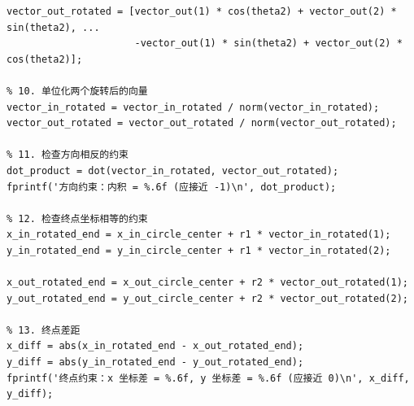 \documentclass{cumcmthesis1}
\begin{document}
\begin{lstlisting}[caption={对问题4中求得的最短调头曲线进行验证的代码}, label={lst:sixth_code}]
% 9. 顺时针旋转后的盘出向量
vector_out_rotated = [vector_out(1) * cos(theta2) + vector_out(2) * sin(theta2), ...
                      -vector_out(1) * sin(theta2) + vector_out(2) * cos(theta2)];

% 10. 单位化两个旋转后的向量
vector_in_rotated = vector_in_rotated / norm(vector_in_rotated);
vector_out_rotated = vector_out_rotated / norm(vector_out_rotated);

% 11. 检查方向相反的约束
dot_product = dot(vector_in_rotated, vector_out_rotated);
fprintf('方向约束：内积 = %.6f (应接近 -1)\n', dot_product);

% 12. 检查终点坐标相等的约束
x_in_rotated_end = x_in_circle_center + r1 * vector_in_rotated(1);
y_in_rotated_end = y_in_circle_center + r1 * vector_in_rotated(2);

x_out_rotated_end = x_out_circle_center + r2 * vector_out_rotated(1);
y_out_rotated_end = y_out_circle_center + r2 * vector_out_rotated(2);

% 13. 终点差距
x_diff = abs(x_in_rotated_end - x_out_rotated_end);
y_diff = abs(y_in_rotated_end - y_out_rotated_end);
fprintf('终点约束：x 坐标差 = %.6f, y 坐标差 = %.6f (应接近 0)\n', x_diff, y_diff);

\end{lstlisting}
\end{document}
